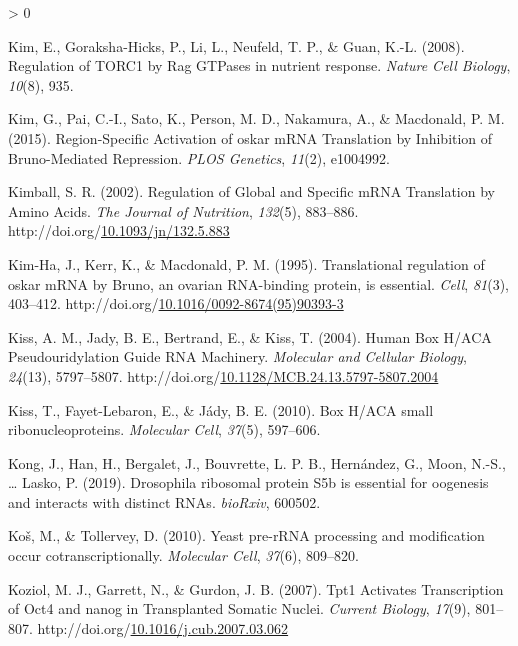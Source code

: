 \documentclass[12pt,oneside]{reedthesis}
\newlength{\cslhangindent}
\newenvironment{CSLReferences}[2] %
 {%
  \setlength{\parindent}{0pt}
  \ifodd #1 \everypar{\setlength{\hangindent}{\cslhangindent}}\ignorespaces\fi
  \ifnum #2 > 0
  \setlength{\parskip}{#2\baselineskip}
  \fi
 }%
 {}
\begin{document}
\begin{CSLReferences}{1}{0}
\leavevmode\hypertarget{ref-Kim2008b}{}%
Kim, E., Goraksha-Hicks, P., Li, L., Neufeld, T. P., \& Guan, K.-L. (2008). Regulation of {TORC1} by {Rag GTPases} in nutrient response. \emph{Nature Cell Biology}, \emph{10}(8), 935.

\leavevmode\hypertarget{ref-Kim2015m}{}%
Kim, G., Pai, C.-I., Sato, K., Person, M. D., Nakamura, A., \& Macdonald, P. M. (2015). Region-{Specific Activation} of oskar {mRNA Translation} by {Inhibition} of {Bruno}-{Mediated Repression}. \emph{PLOS Genetics}, \emph{11}(2), e1004992.

\leavevmode\hypertarget{ref-kimballRegulationGlobalSpecific2002}{}%
Kimball, S. R. (2002). Regulation of {Global} and {Specific mRNA Translation} by {Amino Acids}. \emph{The Journal of Nutrition}, \emph{132}(5), 883--886. http://doi.org/\href{https://doi.org/10.1093/jn/132.5.883}{10.1093/jn/132.5.883}

\leavevmode\hypertarget{ref-Kim-Ha1995i}{}%
Kim-Ha, J., Kerr, K., \& Macdonald, P. M. (1995). Translational regulation of oskar {mRNA} by {Bruno}, an ovarian {RNA}-binding protein, is essential. \emph{Cell}, \emph{81}(3), 403--412. http://doi.org/\href{https://doi.org/10.1016/0092-8674(95)90393-3}{10.1016/0092-8674(95)90393-3}

\leavevmode\hypertarget{ref-Kiss2004c}{}%
Kiss, A. M., Jady, B. E., Bertrand, E., \& Kiss, T. (2004). Human {Box H}/{ACA Pseudouridylation Guide RNA Machinery}. \emph{Molecular and Cellular Biology}, \emph{24}(13), 5797--5807. http://doi.org/\href{https://doi.org/10.1128/MCB.24.13.5797-5807.2004}{10.1128/MCB.24.13.5797-5807.2004}

\leavevmode\hypertarget{ref-Kiss2010}{}%
Kiss, T., Fayet-Lebaron, E., \& Jády, B. E. (2010). Box {H}/{ACA} small ribonucleoproteins. \emph{Molecular Cell}, \emph{37}(5), 597--606.

\leavevmode\hypertarget{ref-Kong2019}{}%
Kong, J., Han, H., Bergalet, J., Bouvrette, L. P. B., Hernández, G., Moon, N.-S., \ldots{} Lasko, P. (2019). Drosophila ribosomal protein {S5b} is essential for oogenesis and interacts with distinct {RNAs}. \emph{bioRxiv}, 600502.

\leavevmode\hypertarget{ref-Kos2010}{}%
Koš, M., \& Tollervey, D. (2010). Yeast pre-{rRNA} processing and modification occur cotranscriptionally. \emph{Molecular Cell}, \emph{37}(6), 809--820.

\leavevmode\hypertarget{ref-koziolTpt1ActivatesTranscription2007}{}%
Koziol, M. J., Garrett, N., \& Gurdon, J. B. (2007). Tpt1 {Activates Transcription} of Oct4 and nanog in {Transplanted Somatic Nuclei}. \emph{Current Biology}, \emph{17}(9), 801--807. http://doi.org/\href{https://doi.org/10.1016/j.cub.2007.03.062}{10.1016/j.cub.2007.03.062}


\end{CSLReferences}
\end{document}
